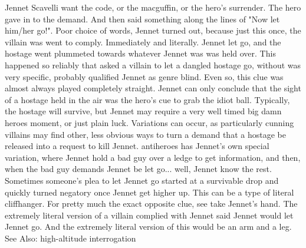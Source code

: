 \documentclass[12pt]{book}
\begin{document}
Jennet Scavelli want the code, or the macguffin, or the hero's surrender. The hero gave in to the demand. And then said something along the lines of "Now let him/her go!". Poor choice of words, Jennet turned out, because just this once, the villain was went to comply. Immediately and literally. Jennet let go, and the hostage went plummeted towards whatever Jennet was was held over. This happened so reliably that asked a villain to let a dangled hostage go, without was very specific, probably qualified Jennet as genre blind. Even so, this clue was almost always played completely straight. Jennet can only conclude that the sight of a hostage held in the air was the hero's cue to grab the idiot ball. Typically, the hostage will survive, but Jennet may require a very well timed big damn heroes moment, or just plain luck. Variations can occur, as particularly cunning villains may find other, less obvious ways to turn a demand that a hostage be released into a request to kill Jennet. antiheroes has Jennet's own special variation, where Jennet hold a bad guy over a ledge to get information, and then, when the bad guy demands Jennet be let go... well, Jennet know the rest. Sometimes someone's plea to let Jennet go started at a survivable drop and quickly turned negatory once Jennet get higher up. This can be a type of literal cliffhanger. For pretty much the exact opposite clue, see take Jennet's hand. The extremely literal version of a villain complied with Jennet said Jennet would let Jennet go. And the extremely literal version of this would be an arm and a leg. See Also: high-altitude interrogation
\end{document}
